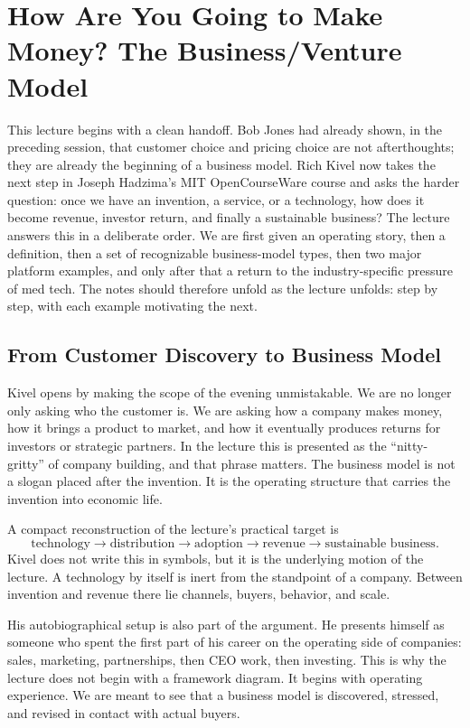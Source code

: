 \chapter{How Are You Going to Make Money? The Business/Venture Model}

This lecture begins with a clean handoff. Bob Jones had already shown, in the preceding session, that customer choice and pricing choice are not afterthoughts; they are already the beginning of a business model. Rich Kivel now takes the next step in Joseph Hadzima's MIT OpenCourseWare course and asks the harder question: once we have an invention, a service, or a technology, how does it become revenue, investor return, and finally a sustainable business? The lecture answers this in a deliberate order. We are first given an operating story, then a definition, then a set of recognizable business-model types, then two major platform examples, and only after that a return to the industry-specific pressure of med tech. The notes should therefore unfold as the lecture unfolds: step by step, with each example motivating the next.

\section{From Customer Discovery to Business Model}

Kivel opens by making the scope of the evening unmistakable. We are no longer only asking who the customer is. We are asking how a company makes money, how it brings a product to market, and how it eventually produces returns for investors or strategic partners. In the lecture this is presented as the ``nitty-gritty'' of company building, and that phrase matters. The business model is not a slogan placed after the invention. It is the operating structure that carries the invention into economic life.

A compact reconstruction of the lecture's practical target is
\begin{equation}
\text{technology} \to \text{distribution} \to \text{adoption} \to \text{revenue} \to \text{sustainable business}.
\end{equation}
Kivel does not write this in symbols, but it is the underlying motion of the lecture. A technology by itself is inert from the standpoint of a company. Between invention and revenue there lie channels, buyers, behavior, and scale.

His autobiographical setup is also part of the argument. He presents himself as someone who spent the first part of his career on the operating side of companies: sales, marketing, partnerships, then CEO work, then investing. This is why the lecture does not begin with a framework diagram. It begins with operating experience. We are meant to see that a business model is discovered, stressed, and revised in contact with actual buyers.

